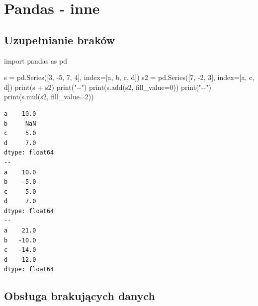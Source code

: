 \documentclass[
  polish,
  letterpaper,
  DIV=11,
  numbers=noendperiod]{scrreprt}
\newenvironment{Shaded}{\begin{snugshade}}{\end{snugshade}}
\newcommand{\BuiltInTok}[1]{\textcolor[rgb]{0.00,0.23,0.31}{#1}}
\newcommand{\DecValTok}[1]{\textcolor[rgb]{0.68,0.00,0.00}{#1}}
\newcommand{\ImportTok}[1]{\textcolor[rgb]{0.00,0.46,0.62}{#1}}
\newcommand{\NormalTok}[1]{\textcolor[rgb]{0.00,0.23,0.31}{#1}}
\newcommand{\OperatorTok}[1]{\textcolor[rgb]{0.37,0.37,0.37}{#1}}
\newcommand{\StringTok}[1]{\textcolor[rgb]{0.13,0.47,0.30}{#1}}
\begin{document}
\chapter{Pandas - inne}\label{pandas---inne}

\section{Uzupełnianie braków}\label{uzupeux142nianie-brakuxf3w}

\begin{Shaded}
\begin{Highlighting}[]
\ImportTok{import}\NormalTok{ pandas }\ImportTok{as}\NormalTok{ pd}

\NormalTok{s }\OperatorTok{=}\NormalTok{ pd.Series([}\DecValTok{3}\NormalTok{, }\OperatorTok{{-}}\DecValTok{5}\NormalTok{, }\DecValTok{7}\NormalTok{, }\DecValTok{4}\NormalTok{], index}\OperatorTok{=}\NormalTok{[}\StringTok{\textquotesingle{}a\textquotesingle{}}\NormalTok{, }\StringTok{\textquotesingle{}b\textquotesingle{}}\NormalTok{, }\StringTok{\textquotesingle{}c\textquotesingle{}}\NormalTok{, }\StringTok{\textquotesingle{}d\textquotesingle{}}\NormalTok{])}
\NormalTok{s2 }\OperatorTok{=}\NormalTok{ pd.Series([}\DecValTok{7}\NormalTok{, }\OperatorTok{{-}}\DecValTok{2}\NormalTok{, }\DecValTok{3}\NormalTok{], index}\OperatorTok{=}\NormalTok{[}\StringTok{\textquotesingle{}a\textquotesingle{}}\NormalTok{, }\StringTok{\textquotesingle{}c\textquotesingle{}}\NormalTok{, }\StringTok{\textquotesingle{}d\textquotesingle{}}\NormalTok{])}
\BuiltInTok{print}\NormalTok{(s }\OperatorTok{+}\NormalTok{ s2)}
\BuiltInTok{print}\NormalTok{(}\StringTok{"{-}{-}"}\NormalTok{)}
\BuiltInTok{print}\NormalTok{(s.add(s2, fill\_value}\OperatorTok{=}\DecValTok{0}\NormalTok{))}
\BuiltInTok{print}\NormalTok{(}\StringTok{"{-}{-}"}\NormalTok{)}
\BuiltInTok{print}\NormalTok{(s.mul(s2, fill\_value}\OperatorTok{=}\DecValTok{2}\NormalTok{))}
\end{Highlighting}
\end{Shaded}

\begin{verbatim}
a    10.0
b     NaN
c     5.0
d     7.0
dtype: float64
--
a    10.0
b    -5.0
c     5.0
d     7.0
dtype: float64
--
a    21.0
b   -10.0
c   -14.0
d    12.0
dtype: float64
\end{verbatim}

\section{Obsługa brakujących
danych}\label{obsux142uga-brakujux105cych-danych}
\end{document}
